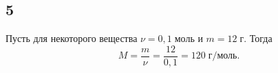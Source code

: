 \subsection{5}

Пусть для некоторого вещества $\nu=0{,}1\;\text{моль}$ и $m=12\;\text{г}$. Тогда
\[
M=\frac{m}{\nu}=\frac{12}{0{,}1}=120\;\text{г/моль}.
\]